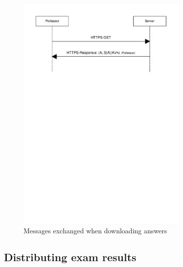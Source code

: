 \documentclass{article}
\begin{document}
\begin{figure}
  \begin{center}
  \includegraphics[width=0.75\textwidth]{images/download_answers.pdf}
  \caption{Messages exchanged when downloading answers}
  \label{fig:download-answers}
  \end{center}
\end{figure}

\subsection{Distributing exam results}
\label{subsec:impl-results}
\end{document}
